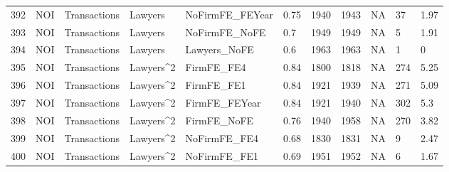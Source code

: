 \documentclass{article}
\begin{document}
\begin{table}[H]
\begin{tabular}{rllllllllll}
  392 & NOI & Transactions & Lawyers & NoFirmFE\_FEYear & 0.75 & 1940 & 1943 & NA & 37 & 1.97 \\ 
  393 & NOI & Transactions & Lawyers & NoFirmFE\_NoFE & 0.7 & 1949 & 1949 & NA & 5 & 1.91 \\ 
  394 & NOI & Transactions & Lawyers & Lawyers\_NoFE & 0.6 & 1963 & 1963 & NA & 1 & 0 \\ 
  395 & NOI & Transactions & Lawyers^2 & FirmFE\_FE4 & 0.84 & 1800 & 1818 & NA & 274 & 5.25 \\ 
  396 & NOI & Transactions & Lawyers^2 & FirmFE\_FE1 & 0.84 & 1921 & 1939 & NA & 271 & 5.09 \\ 
  397 & NOI & Transactions & Lawyers^2 & FirmFE\_FEYear & 0.84 & 1921 & 1940 & NA & 302 & 5.3 \\ 
  398 & NOI & Transactions & Lawyers^2 & FirmFE\_NoFE & 0.76 & 1940 & 1958 & NA & 270 & 3.82 \\ 
  399 & NOI & Transactions & Lawyers^2 & NoFirmFE\_FE4 & 0.68 & 1830 & 1831 & NA & 9 & 2.47 \\ 
  400 & NOI & Transactions & Lawyers^2 & NoFirmFE\_FE1 & 0.69 & 1951 & 1952 & NA & 6 & 1.67 \\ 
   \hline
\end{tabular}
\end{table}
\end{document}
